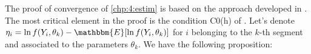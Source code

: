 \begin{appendices}


The proof of convergence of \eqref{chp:4:estim} is based on the approach developed in \cite{Lavielle1997}. The most critical element in the proof is the condition C0(h) of \cite{Lavielle1997}. Let's denote $\eta_i = \ln f(Y_i,\theta_{k})-\mathbbm{E}[\ln f(Y_i,\theta_{k})]$ for $i$ belonging to the $k$-th segment and associated to the parameters $\theta_{k}$. We have the following proposition: 
 

\end{appendices}
